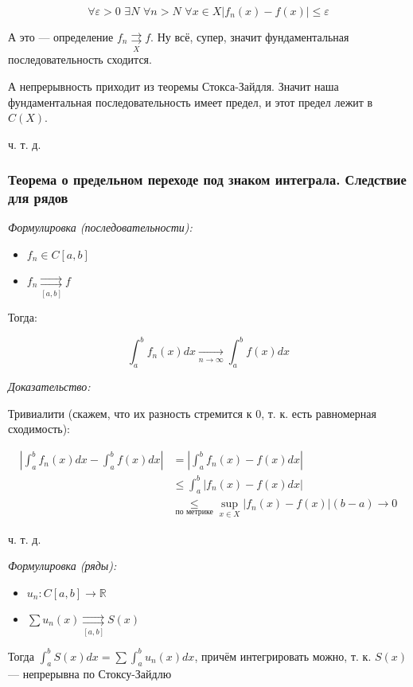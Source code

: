 \documentclass{article}
\def\dbl{\,\,}
\def\rsh#1{\underset{#1}{\rightrightarrows}}
\begin{document}
\[\forall \varepsilon > 0 \dbl \exists N \dbl \forall n > N \dbl \forall x \in X |f_n(x) - f(x)| \le \varepsilon\]

А это --- определение $f_n \rsh{X} f$. Ну всё, супер, значит фундаментальная последовательность сходится.

А непрерывность приходит из теоремы Стокса-Зайдля. Значит наша фундаментальная последовательность имеет предел, и этот предел лежит в $C(X)$.

ч. т. д. 

\subsubsection{Теорема о предельном переходе под знаком интеграла. Следствие для рядов}
\textit{Формулировка (последовательности):}

\begin{itemize}
    \item $f_n \in C[a, b]$
    \item $f_n \rsh{[a, b]} f$
\end{itemize}

Тогда:

\[\int_a^b{f_n(x)dx} \underset{n \rightarrow \infty}{\longrightarrow} \int_a^b{f(x)dx}\]

\textit{Доказательство:}

Тривиалити (скажем, что их разность стремится к 0, т. к. есть равномерная сходимость): 

\begin{align*}
    \left|\int_a^b{f_n(x)dx} - \int_a^b{f(x)dx}\right|
 &=  \left|\int_a^b{f_n(x) - f(x)dx}\right| \\
  &\le \int_a^b \left|f_n(x) - f(x) dx\right| \\ 
  &\underset{\text{по метрике}}{\le} {\sup_{x \in X} \left|f_n(x) - f(x)\right|}(b - a) \rightarrow 0
\end{align*}

ч. т. д.

\textit{Формулировка (ряды):}

\begin{itemize}
    \item $u_n: C[a, b] \rightarrow \mathbb{R}$
    \item $\sum u_n(x) \rsh{[a, b]} S(x)$
\end{itemize}

Тогда $\int_a^bS(x)dx =\sum \int_a^b u_n(x) dx$, причём интегрировать можно, т. к. $S(x)$ --- непрерывна по Стоксу-Зайдлю
\end{document}
